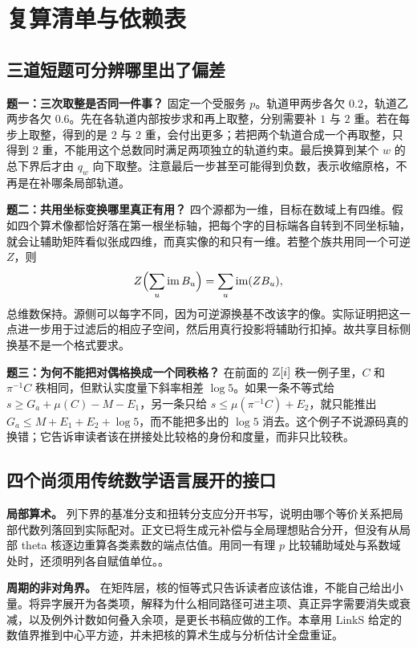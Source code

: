 \section{复算清单与依赖表}
\subsection{三道短题可分辨哪里出了偏差}
\textbf{题一：三次取整是否同一件事？}
固定一个受服务 $p$。轨道甲两步各欠 $0.2$，轨道乙两步各欠 $0.6$。先在各轨道内部按步求和再上取整，分别需要补 $1$ 与 $2$ 重。若在每步上取整，得到的是 $2$ 与 $2$ 重，会付出更多；若把两个轨道合成一个再取整，只得到 $2$ 重，不能用这个总数同时满足两项独立的轨道约束。最后换算到某个 $w$ 的总下界后才由 $q_w$ 向下取整。注意最后一步甚至可能得到负数，表示收缩原格，不再是在补哪条局部轨道。

\textbf{题二：共用坐标变换哪里真正有用？}
四个源都为一维，目标在数域上有四维。假如四个算术像都恰好落在第一根坐标轴，把每个字的目标端各自转到不同坐标轴，就会让辅助矩阵看似张成四维，而真实像的和只有一维。若整个族共用同一个可逆 $Z$，则
\[
      Z\Bigl(\sum_u \operatorname{im}B_u\Bigr)
      =\sum_u\operatorname{im}(ZB_u),
\]
总维数保持。源侧可以每字不同，因为可逆源换基不改该字的像。实际证明把这一点进一步用于过滤后的相应子空间，然后用真行投影将辅助行扣掉。故共享目标侧换基不是一个格式要求。

\textbf{题三：为何不能把对偶格换成一个同秩格？}
在前面的 $\mathbb Z[i]$ 秩一例子里，$C$ 和 $\pi^{-1}C$ 秩相同，但默认实度量下斜率相差 $\log5$。如果一条不等式给 $s\ge G_a+\mu(C)-M-E_1$，另一条只给
$s\le\mu(\pi^{-1}C)+E_2$，就只能推出
$G_a\le M+E_1+E_2+\log5$，而不能把多出的 $\log5$ 消去。这个例子不说源码真的换错；它告诉审读者该在拼接处比较格的身份和度量，而非只比较秩。

\subsection{四个尚须用传统数学语言展开的接口}
\textbf{局部算术。} 列下界的基准分支和扭转分支应分开书写，说明由哪个等价关系把局部代数列落回到实际配对。正文已将生成元补偿与全局理想贴合分开，但没有从局部 theta 核逐边重算各类素数的端点估值。用同一有理 $p$ 比较辅助域处与系数域处时，还须明列各自赋值单位。。

\textbf{周期的非对角界。} 在矩阵层，核的恒等式只告诉读者应该估谁，不能自己给出小量。将异字展开为各类项，解释为什么相同路径可进主项、真正异字需要消失或衰减，以及例外计数如何叠入余项，是更长书稿应做的工作。本章用 LinkS 给定的数值界推到中心平方迹，并未把核的算术生成与分析估计全盘重证。

